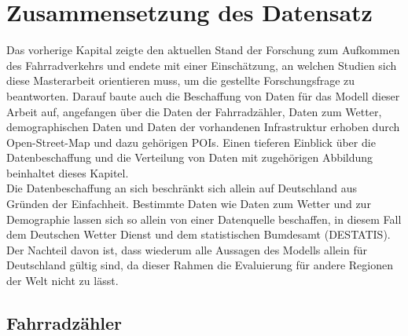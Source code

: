\documentclass[a4paper,12pt]{thesis}
\begin{document}
\chapter{Zusammensetzung des Datensatz}\label{Datensatz}

Das vorherige Kapital zeigte den aktuellen Stand der Forschung zum Aufkommen des Fahrradverkehrs und endete mit einer Einschätzung, an welchen Studien sich diese Masterarbeit orientieren muss, um die gestellte Forschungsfrage zu beantworten. Darauf baute auch die Beschaffung von Daten für das Modell dieser Arbeit auf, angefangen über die Daten der Fahrradzähler, Daten zum Wetter, demographischen Daten und Daten der vorhandenen Infrastruktur erhoben durch Open-Street-Map und dazu gehörigen POIs. Einen tieferen Einblick über die Datenbeschaffung und die Verteilung von Daten mit zugehörigen Abbildung beinhaltet dieses Kapitel.\\
Die Datenbeschaffung an sich beschränkt sich allein auf Deutschland aus Gründen der Einfachheit. Bestimmte Daten wie Daten zum Wetter und zur Demographie lassen sich so allein von einer Datenquelle beschaffen, in diesem Fall dem Deutschen Wetter Dienst und dem statistischen Bumdesamt (DESTATIS). Der Nachteil davon ist, dass wiederum alle Aussagen des Modells allein für Deutschland gültig sind, da dieser Rahmen die Evaluierung für andere Regionen der Welt nicht zu lässt.

\section{Fahrradzähler}
\end{document}
